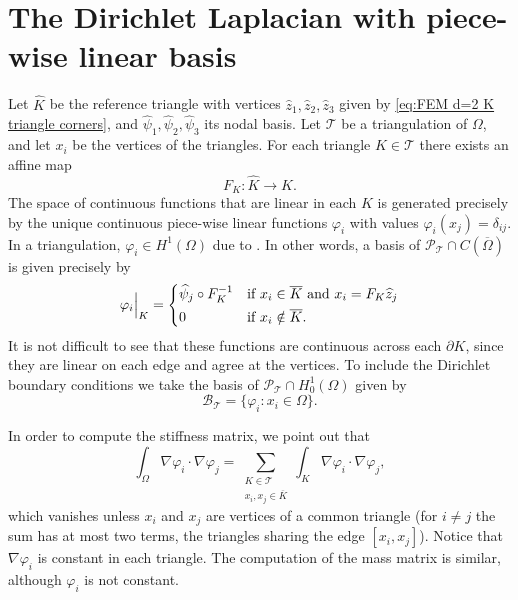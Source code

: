 \section{The Dirichlet Laplacian with piece-wise linear basis}

Let $\widehat K$ be the reference triangle with vertices $\widehat z_1, \widehat z_2, \widehat z_3$ given by \eqref{eq:FEM d=2 K triangle corners}, and $\widehat \psi_1, \widehat \psi_2, \widehat \psi_3$ its nodal basis.
Let $\mathcal T$ be a triangulation of $\Omega$, and let $x_i$ be the vertices of the triangles. For each triangle $K \in \mathcal T$ there exists an affine map
\begin{equation*}
    F_K : {\widehat K} \to  K.
\end{equation*}
The space of continuous functions that are linear in each $K$ is generated precisely by the unique continuous piece-wise linear functions $\varphi_i$ with values $\varphi_i(x_j) = \delta_{ij}$.
In a triangulation, $\varphi_i \in H^1 (\Omega)$ due to .
In other words, a basis of $\mathcal P_{\mathcal T} \cap C (\overline \Omega)$ is given precisely by
\begin{equation*}
    \varphi_i \Big|_K = \begin{dcases}
        \widehat\psi_j \circ F_K^{-1} & \text{if } x_i \in \overline K \text{ and } x_i = F_K \widehat z_j \\
        0                             & \text{if } x_i \notin \overline K.
    \end{dcases}
\end{equation*}
It is not difficult to see that these functions are continuous across each $\partial K$, since they are linear on each edge and agree at the vertices.
To include the Dirichlet boundary conditions we take the basis of $\mathcal P_{\mathcal T} \cap H_0^1(\Omega)$ given by
\begin{equation*}
    \mathcal B_{\mathcal T} = \{ \varphi_i : x_i \in \Omega \}.
\end{equation*}

In order to compute the stiffness matrix, we point out that
\begin{equation*}
    \int_\Omega \nabla \varphi_i \cdot \nabla \varphi_j =
    \sum_{\substack{K \in \mathcal T \\ x_i, x_j \in \overline K}}
    \int_K \nabla \varphi_i \cdot \nabla \varphi_j,
\end{equation*}
which vanishes unless $x_i$ and $x_j$ are vertices of a common triangle (for $i \ne j$ the sum has at most two terms, the triangles sharing the edge $[x_i, x_j]$).
Notice that $\nabla \varphi_i$ is constant in each triangle. The computation of the mass matrix is similar, although $\varphi_i$ is not constant.

